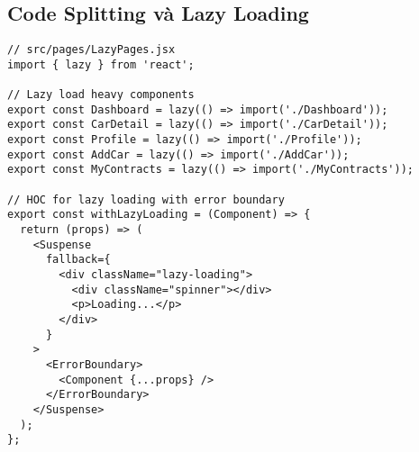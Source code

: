 \documentclass[12pt,a4paper]{article}
\begin{document}
\subsection{Code Splitting và Lazy Loading}
\begin{lstlisting}[caption=Code Splitting Implementation]
// src/pages/LazyPages.jsx
import { lazy } from 'react';

// Lazy load heavy components
export const Dashboard = lazy(() => import('./Dashboard'));
export const CarDetail = lazy(() => import('./CarDetail'));
export const Profile = lazy(() => import('./Profile'));
export const AddCar = lazy(() => import('./AddCar'));
export const MyContracts = lazy(() => import('./MyContracts'));

// HOC for lazy loading with error boundary
export const withLazyLoading = (Component) => {
  return (props) => (
    <Suspense 
      fallback={
        <div className="lazy-loading">
          <div className="spinner"></div>
          <p>Loading...</p>
        </div>
      }
    >
      <ErrorBoundary>
        <Component {...props} />
      </ErrorBoundary>
    </Suspense>
  );
};
\end{lstlisting}
\end{document}
